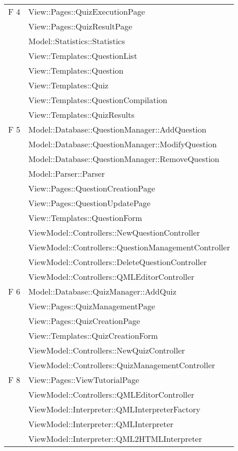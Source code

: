 \begin{longtable}{p{}p{}}
\midrule	
F 4		& View::Pages::QuizExecutionPage\\
		& View::Pages::QuizResultPage\\
		& Model::Statistics::Statistics\\
		& View::Templates::QuestionList\\
		& View::Templates::Question\\
		& View::Templates::Quiz\\
		& View::Templates::QuestionCompilation\\
		& View::Templates::QuizResults\\
\midrule
F 5		& Model::Database::QuestionManager::AddQuestion\\
		& Model::Database::QuestionManager::ModifyQuestion\\
		& Model::Database::QuestionManager::RemoveQuestion\\
		& Model::Parser::Parser\\
		& View::Pages::QuestionCreationPage\\
			& View::Pages::QuestionUpdatePage\\
			& View::Templates::QuestionForm\\	
			& ViewModel::Controllers::NewQuestionController\\
			& ViewModel::Controllers::QuestionManagementController\\
			& ViewModel::Controllers::DeleteQuestionController\\
			& ViewModel::Controllers::QMLEditorController\\
\midrule
F 6		& Model::Database::QuizManager::AddQuiz\\
& View::Pages::QuizManagementPage\\	
		& View::Pages::QuizCreationPage\\
		& View::Templates::QuizCreationForm\\
		& ViewModel::Controllers::NewQuizController\\
		& ViewModel::Controllers::QuizManagementController\\

\midrule
F 8 & View::Pages::ViewTutorialPage\\
	& ViewModel::Controllers::QMLEditorController\\
	& ViewModel::Interpreter::QMLInterpreterFactory\\
	& ViewModel::Interpreter::QMLInterpreter\\
	& ViewModel::Interpreter::QML2HTMLInterpreter\\
\midrule
\end{longtable}